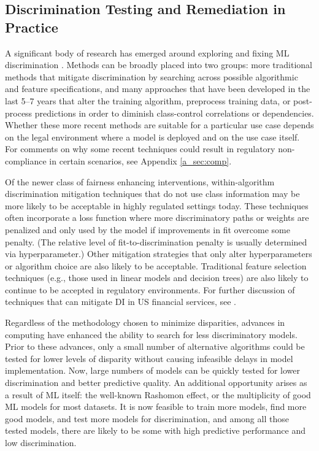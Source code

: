 \documentclass[information,article,submit,moreauthors,pdftex]{definitions/mdpi}
\begin{document}
\subsection{Discrimination Testing and Remediation in Practice}\label{ssec:disc_rem}

A significant body of research has emerged around exploring and fixing ML discrimination \cite{friedler2019comparative}. Methods can be broadly placed into two groups: more traditional methods that mitigate discrimination by searching across possible algorithmic and feature specifications, and many approaches that have been developed in the last 5--7 years that alter the training algorithm, preprocess training data, or post-process predictions in order to diminish class-control correlations or dependencies. Whether these more recent methods are suitable for a particular use case depends on the legal environment where a model is deployed and on the use case itself. For comments on why some recent techniques could result in regulatory non-compliance in certain scenarios, see Appendix \ref{a_sec:comp}.

Of the newer class of fairness enhancing interventions, within-algorithm discrimination mitigation techniques that do not use class information may be more likely to be acceptable in highly regulated settings today. These techniques often incorporate a loss function where more discriminatory paths or weights are penalized and only used by the model if improvements in fit overcome some penalty. (The relative level of fit-to-discrimination penalty is usually determined via hyperparameter.) Other mitigation strategies that only alter hyperparameters or algorithm choice are also likely to be acceptable. Traditional feature selection techniques (e.g., those used in linear models and decision trees) are also likely to continue to be accepted in regulatory environments. For further discussion of techniques that can mitigate DI in US financial services, see \citet{schmidt2019introduction}. 

Regardless of the methodology chosen to minimize disparities, advances in computing have enhanced the ability to search for less discriminatory models.  Prior to these advances, only a small number of alternative algorithms could be tested for lower levels of disparity without causing infeasible delays in model implementation.  Now, large numbers of models can be quickly tested for lower discrimination and better predictive quality.  An additional opportunity arises as a result of ML itself: the well-known Rashomon effect, or the multiplicity of good ML models for most datasets. It is now feasible to train more models, find more good models, and test more models for discrimination, and among all those tested models, there are likely to be some with high predictive performance and low discrimination.
\end{document}
